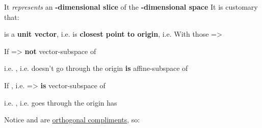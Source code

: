 \begin{itemize}

      \vItem
            It \emph{represents} an \textbf{-dimensional slice} of
            the \textbf{-dimensional space}
      \vItem
            It is customary that:

            \begin{itemize}

                  \vItem
                         is a \textbf{unit vector},
                        i.e. 
                  \vItem
                         is \textbf{closest point to origin},
                        i.e. 
                  \vItem
                        With those =>
            \end{itemize}
      \vItem
            If 
            =>  \textbf{not} vector-subspace of 

            \begin{itemize}

                  \vItem
                        i.e. , i.e.  doesn't go through the origin
                  \vItem
                         \textbf{is} affine-subspace of 
            \end{itemize}
      \vItem
            If , i.e.  =>
             \textbf{is} vector-subspace of 

            \begin{itemize}

                  \vItem
                        i.e. , i.e.  goes through the origin
                  \vItem
                         has 
            \end{itemize}
\end{itemize}

\hSep %

Notice  and  are \ul{orthogonal compliments}, so:

